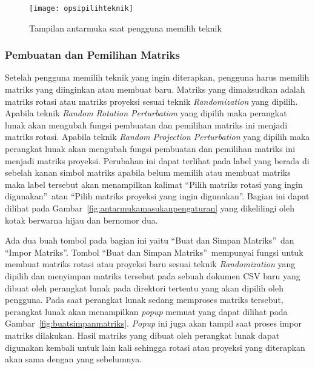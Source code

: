 \begin{figure}
	\centering
	\texttt{[image: opsipilihteknik]}
	\caption{Tampilan antarmuka saat pengguna memilih teknik}
	\label{fig:opsipilihteknik}
\end{figure}

\subsubsection{Pembuatan dan Pemilihan Matriks}
\label{subsubsec:pilihmatriks}

Setelah pengguna memilih teknik yang ingin diterapkan, pengguna harus memilih matriks yang diinginkan atau membuat baru. Matriks yang dimaksudkan adalah matriks rotasi atau matriks proyeksi sesuai teknik \textit{Randomization} yang dipilih. Apabila teknik \textit{Random Rotation Perturbation} yang dipilih maka perangkat lunak akan mengubah fungsi pembuatan dan pemilihan matriks ini menjadi matriks rotasi. Apabila teknik \textit{Random Projection Perturbation} yang dipilih maka perangkat lunak akan mengubah fungsi pembuatan dan pemilihan matriks ini menjadi matriks proyeksi. Perubahan ini dapat terlihat pada label yang berada di sebelah kanan simbol matriks apabila belum memilih atau membuat matriks maka label tersebut akan menampilkan kalimat \textquotedblleft Pilih matriks rotasi yang ingin digunakan\textquotedblright~atau \textquotedblleft Pilih matriks proyeksi yang ingin digunakan\textquotedblright. Bagian ini dapat dilihat pada Gambar~\ref{fig:antarmukamasukanpengaturan} yang dikelilingi oleh kotak berwarna hijau dan bernomor dua.

Ada dua buah tombol pada bagian ini yaitu \textquotedblleft Buat dan Simpan Matriks\textquotedblright~dan \textquotedblleft Impor Matriks\textquotedblright. Tombol \textquotedblleft Buat dan Simpan Matriks\textquotedblright~mempunyai fungsi untuk membuat matriks rotasi atau proyeksi baru sesuai teknik \textit{Randomization} yang dipilih dan menyimpan matriks tersebut pada sebuah dokumen CSV baru yang dibuat oleh perangkat lunak pada direktori tertentu yang akan dipilih oleh pengguna. Pada saat perangkat lunak sedang memproses matriks tersebut, perangkat lunak akan menampilkan \textit{popup} memuat yang dapat dilihat pada Gambar~\ref{fig:buatsimpanmatriks}. \textit{Popup} ini juga akan tampil saat proses impor matriks dilakukan. Hasil matriks yang dibuat oleh perangkat lunak dapat digunakan kembali untuk lain kali sehingga rotasi atau proyeksi yang diterapkan akan sama dengan yang sebelumnya. 

